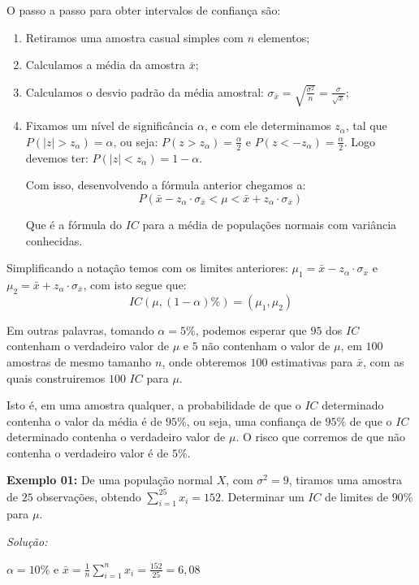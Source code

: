 \documentclass[oneside,a4paper,12pt]{article}
\begin{document}
O passo a passo para obter intervalos de confiança são:
\begin{enumerate}
	\item Retiramos uma amostra casual simples com $n$ elementos;
	\item Calculamos a média da amostra $\bar{x}$;
	\item Calculamos o desvio padrão da média amostral: $\sigma_{\bar{x}} = \displaystyle \sqrt{\frac{\sigma^2}{n}} = \frac{\sigma}{\sqrt{x}}$;
	\item Fixamos um nível de significância $\alpha$, e com ele determinamos $z_\alpha$, tal que $P(|z|>z_\alpha) = \alpha$, ou seja: $P(z>z_\alpha) = \displaystyle \frac{\alpha}{2}$ e $P(z<-z_\alpha) = \displaystyle \frac{\alpha}{2}$. Logo devemos ter: $P(|z| < z_\alpha) = 1-\alpha$. 
	
	Com isso, desenvolvendo a fórmula anterior chegamos a:
	$$P(\bar{x}-z_\alpha\cdot \sigma_{\bar{x}} < \mu < \bar{x}+z_\alpha\cdot \sigma_{\bar{x}})$$
	
	Que é a fórmula do $IC$ para a média de populações normais com variância conhecidas.
\end{enumerate}

Simplificando a notação temos com os limites anteriores: $\mu_1 = \bar{x}-z_\alpha\cdot \sigma_{\bar{x}} $ e $\mu_2 = \bar{x}+z_\alpha\cdot \sigma_{\bar{x}}$, com isto segue que:
$$IC(\mu,(1-\alpha)\%) = (\mu_1,\mu_2)$$

Em outras palavras, tomando $\alpha = 5\%$, podemos esperar que $95$ dos $IC$ contenham o verdadeiro valor de $\mu$ e $5$ não contenham o valor de $\mu$, em $100$ amostras de mesmo tamanho $n$, onde obteremos $100$ estimativas para $\bar{x}$, com as quais construiremos $100$ $IC$ para $\mu$.

Isto é, em uma amostra qualquer, a probabilidade de que o $IC$ determinado contenha o valor da média é de $95\%$, ou seja, uma confiança de $95\%$ de que o $IC$ determinado contenha o verdadeiro valor de $\mu$. O risco que corremos de que não contenha o verdadeiro valor é de $5\%$.

\textbf{Exemplo 01:} De uma população normal $X$, com $\sigma^2 = 9$, tiramos uma amostra de $25$ observações, obtendo $\displaystyle \sum_{i=1}^{25}x_i = 152$. Determinar um $IC$ de limites de $90\%$ para $\mu$.

\textit{Solução: }

$\alpha = 10\%$ e $\bar{x} = \displaystyle \frac{1}{n}\sum_{i = 1}^{n}x_i = \frac{152}{25} = 6,08$
\end{document}
